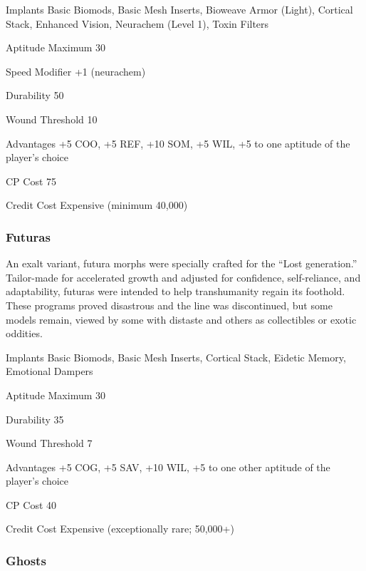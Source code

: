 \begin{description*} \item[Implants] Basic Biomods, Basic Mesh Inserts, Bioweave Armor (Light), Cortical Stack, Enhanced Vision, Neurachem (Level 1), Toxin Filters \item[Aptitude Maximum] 30 \item[Speed Modifier] +1 (neurachem) \item[Durability] 50 \item[Wound Threshold] 10 \item[Advantages] +5 COO, +5 REF, +10 SOM, +5 WIL, +5 to one aptitude of the player’s choice \item[CP Cost] 75 \item[Credit Cost] Expensive (minimum 40,000) \end{description*} 

\subsubsection{Futuras} \label{sec:starting-futuras} 

An exalt variant, futura morphs were specially crafted for the “Lost generation.” Tailor-made for accelerated growth and adjusted for confidence, self-reliance, and adaptability, futuras were intended to help transhumanity regain its foothold. These programs proved disastrous and the line was discontinued, but some models remain, viewed by some with distaste and others as collectibles or exotic oddities. 

\begin{description*} \item[Implants] Basic Biomods, Basic Mesh Inserts, Cortical Stack, Eidetic Memory, Emotional Dampers \item[Aptitude Maximum] 30 \item[Durability] 35 \item[Wound Threshold] 7 \item[Advantages] +5 COG, +5 SAV, +10 WIL, +5 to one other aptitude of the player’s choice \item[CP Cost] 40 \item[Credit Cost] Expensive (exceptionally rare; 50,000+) \end{description*} 

\subsubsection{Ghosts} \label{sec:starting-ghosts} 

